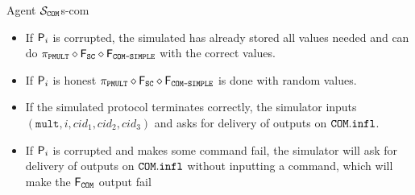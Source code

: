 \begin{protocol}{Agent $\mathcal S_{\COM}$}{s-com}
\begin{itemize}
\begin{itemize}
    	\item If $\P_i$ is corrupted, the simulated has already stored all values needed and can do $\pi_{\texttt{PMULT}} \diamond \F_{\texttt{SC}} \diamond \F_{\texttt{COM-SIMPLE}}$ with the correct values.
      \item If $\P_i$ is honest $\pi_{\texttt{PMULT}} \diamond \F_{\texttt{SC}} \diamond \F_{\texttt{COM-SIMPLE}}$ is done with random values.
      \item If the simulated protocol terminates correctly, the simulator inputs $(\texttt{mult},i,cid_1,cid_2,cid_3)$ and asks for delivery of outputs on $\COM.\texttt{infl}$.
      \item If $\P_i$ is corrupted and makes some command fail, the simulator will ask for delivery of outputs on $\COM.\infl$ without inputting a command, which will make the $\FCOM$ output fail
    \end{itemize}
  \end{itemize}
\end{protocol}
